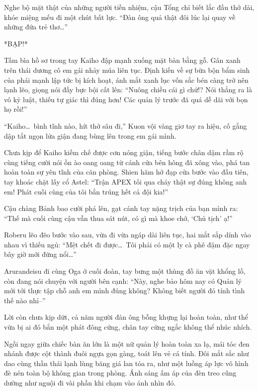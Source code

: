\documentclass[../main.tex]{subfiles}
\begin{document}
Nghe bộ mặt thật của những người tiền nhiệm, cậu Tổng chỉ biết lắc đầu thở dài, khóe miệng mếu đi một chút bất lực. ``Đàn ông quả thật đôi lúc lại quay về những đứa trẻ thơ\dots''

*BẠP!*

Tấm bìa hồ sơ trong tay Kaiho đập mạnh xuống mặt bàn bằng gỗ. Gân xanh trên thái dương cô em gái nhảy múa liên tục. Định kiến về sự bừa bộn bẩm sinh của phái mạnh lập tức bị kích hoạt, ánh mắt xanh lục vốn sắc bén càng trở nên lạnh lẽo, giọng nói đầy bực bội cất lên: ``Nuông chiều cái gì chứ!? Nói thẳng ra là vô kỷ luật, thiếu tự giác thì đúng hơn! Các quản lý trước đã quá dễ dãi với bọn họ rồi!''

``Kaiho\dots\ bình tĩnh nào, hít thở sâu đi,'' Kuon vội vàng giơ tay ra hiệu, cố gắng dập tắt ngọn lửa giận đang bùng lên trong em gái mình.

Chưa kịp để Kaiho kiềm chế được cơn nóng giận, tiếng bước chân dậm rầm rộ cùng tiếng cười nói ồn ào oang oang từ cánh cửa bên hông đã xông vào, phá tan hoàn toàn sự yên tĩnh của căn phòng. Shien hăm hở đạp cửa bước vào đầu tiên, tay khoác chặt lấy cổ Astel: ``Trận APEX tối qua cháy thật sự đúng không anh em! Phát cuối cùng của tôi bắn trúng hết cả đội kia!''

Cậu chàng Bảnh bao cười phá lên, gạt cánh tay nặng trịch của bạn mình ra: ``Thế mà cuối cùng cậu vẫn thua sát nút, có gì mà khoe chớ, `Chủ tịch' ạ!''

Roberu lẽo đẽo bước vào sau, vừa đi vừa ngáp dài liên tục, hai mắt sắp dính vào nhau vì thiếu ngủ: ``Mệt chết đi được\dots\ Tôi phải có một ly cà phê đậm đặc ngay bây giờ mới đứng nổi\dots''

Arurandeisu đi cùng Oga ở cuối đoàn, tay bưng một thùng đồ ăn vặt khổng lồ, còn đang nói chuyện với người bên cạnh: ``Này, nghe bảo hôm nay có Quản lý mới tới thực tập chỗ anh em mình đúng không? Không biết người đó tính tình thế nào nhỉ--''

Lời còn chưa kịp dứt, cả năm người đàn ông bỗng khựng lại hoàn toàn, như thể vừa bị ai đó bắn một phát đông cứng, chân tay cứng ngắc không thể nhúc nhích.

Ngồi ngay giữa chiếc bàn ăn lớn là một nữ quản lý hoàn toàn xa lạ, mái tóc đen nhánh được cột thành đuôi ngựa gọn gàng, toát lên vẻ cá tính. Đôi mắt sắc như dao cùng thần thái lạnh lùng băng giá lan tỏa ra, như một luồng áp lực vô hình đè nén toàn bộ không gian trong phòng. Ánh sáng ấm áp của đèn treo cũng dường như nguội đi vài phần khi chạm vào ánh nhìn đó.
\end{document}
